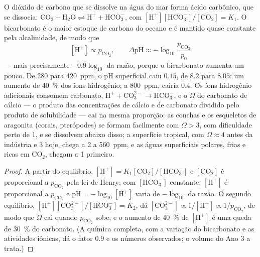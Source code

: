 \begin{theorem}[Acidificação]\label{thm:b2:global-change:acid}
O dióxido de carbono que se dissolve na água do mar forma ácido
carbônico, que se dissocia: $\ensuremath{\mathrm{CO_2}} + \ensuremath{\mathrm{H_2O}} \rightleftharpoons \ensuremath{\mathrm{H^{+}}} +
\ensuremath{\mathrm{HCO_3^{-}}}$, com $[\ensuremath{\mathrm{H^{+}}}][\ensuremath{\mathrm{HCO_3^{-}}}]/[\ensuremath{\mathrm{CO_2}}] = K_1$.
O bicarbonato é o maior estoque de carbono do oceano e é mantido quase
constante pela alcalinidade, de modo que
\[
[\ensuremath{\mathrm{H^{+}}}] \propto p_{\ensuremath{\mathrm{CO_2}}}, \qquad
\Delta\mathrm{pH} \approx -\log_{10}\frac{p_{\ensuremath{\mathrm{CO_2}}}}{p_0}
\]
--- mais precisamente $-0.9\log_{10}$ da razão, porque o bicarbonato
aumenta um pouco. De 280 para \qty{420}{ppm}, o pH superficial caiu
$0.15$, de $8.2$ para $8.05$: um aumento de \qty{40}{\%} dos íons
hidrogênio; a \qty{800}{ppm}, cairia $0.4$. Os íons hidrogênio adicionais
consomem carbonato, $\ensuremath{\mathrm{H^{+}}} + \ensuremath{\mathrm{CO_3^{2-}}} \to \ensuremath{\mathrm{HCO_3^{-}}}$, e
o \emph{} $\Omega$ do carbonato de cálcio ---
o produto das concentrações de cálcio e de carbonato dividido pelo
produto de solubilidade --- cai na mesma proporção: as conchas e os
esqueletos de aragonita (corais, pterópodes) se formam facilmente com $\Omega > 3$,
com dificuldade perto de 1, e se dissolvem abaixo disso; a superfície
tropical, com $\Omega \approx 4$ antes da indústria e 3 hoje, chega a 2
a \qty{560}{ppm}, e as águas superficiais polares, frias e ricas em
\ensuremath{\mathrm{CO_2}}, chegam a 1 primeiro.
\end{theorem}
\begin{proof}
A partir do equilíbrio, $[\ensuremath{\mathrm{H^{+}}}] = K_1[\ensuremath{\mathrm{CO_2}}]/[\ensuremath{\mathrm{HCO_3^{-}}}]$ e
$[\ensuremath{\mathrm{CO_2}}]$ é proporcional a $p_{\ensuremath{\mathrm{CO_2}}}$ pela lei de Henry;
com $[\ensuremath{\mathrm{HCO_3^{-}}}]$ constante, $[\ensuremath{\mathrm{H^{+}}}]$ é proporcional a
$p_{\ensuremath{\mathrm{CO_2}}}$ e $\mathrm{pH} = -\log_{10}[\ensuremath{\mathrm{H^{+}}}]$ varia de
$-\log_{10}$ da razão. O segundo equilíbrio, $[\ensuremath{\mathrm{H^{+}}}][\ensuremath{\mathrm{CO_3^{2-}}}]/[\ensuremath{\mathrm{HCO_3^{-}}}]
= K_2$, dá $[\ensuremath{\mathrm{CO_3^{2-}}}] \propto 1/[\ensuremath{\mathrm{H^{+}}}] \propto
1/p_{\ensuremath{\mathrm{CO_2}}}$, de modo que $\Omega$ cai quando $p_{\ensuremath{\mathrm{CO_2}}}$ sobe, e
o aumento de \qty{40}{\%} de $[\ensuremath{\mathrm{H^{+}}}]$ é uma queda de \qty{30}{\%} do
carbonato. (A química completa, com a variação do bicarbonato e as
atividades iônicas, dá o fator $0.9$ e os números observados; o volume
do Ano 3 a trata.)
\end{proof}
